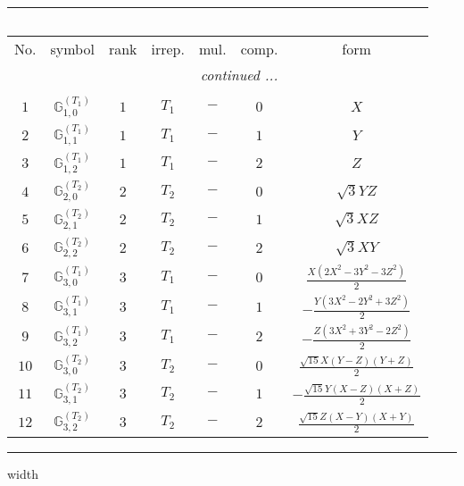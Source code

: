 \documentclass[fleqn,10pt,landscape]{article}
\begin{document}
\begin{itemize}
\begin{center}
\begin{longtable}{ccccccc}
\multicolumn{6}{l}{\tablename\ \thetable{}} \\
 \hline \hline
No. & symbol & rank & irrep. & mul. & comp. & form \\ \hline \endhead

 \hline \hline
\multicolumn{6}{r}{\footnotesize\it continued ...} \\ \endfoot

 \hline \hline
\multicolumn{6}{r}{} \\ \endlastfoot

$ 1 $ & $ \mathbb{G}_{1,0}^{(T_{1})} $ & $ 1 $ & $ T_{1} $ & $ - $ & $ 0 $ & $ X $ \\
$ 2 $ & $ \mathbb{G}_{1,1}^{(T_{1})} $ & $ 1 $ & $ T_{1} $ & $ - $ & $ 1 $ & $ Y $ \\
$ 3 $ & $ \mathbb{G}_{1,2}^{(T_{1})} $ & $ 1 $ & $ T_{1} $ & $ - $ & $ 2 $ & $ Z $ \\ \hline
$ 4 $ & $ \mathbb{G}_{2,0}^{(T_{2})} $ & $ 2 $ & $ T_{2} $ & $ - $ & $ 0 $ & $ \sqrt{3} Y Z $ \\
$ 5 $ & $ \mathbb{G}_{2,1}^{(T_{2})} $ & $ 2 $ & $ T_{2} $ & $ - $ & $ 1 $ & $ \sqrt{3} X Z $ \\
$ 6 $ & $ \mathbb{G}_{2,2}^{(T_{2})} $ & $ 2 $ & $ T_{2} $ & $ - $ & $ 2 $ & $ \sqrt{3} X Y $ \\ \hline
$ 7 $ & $ \mathbb{G}_{3,0}^{(T_{1})} $ & $ 3 $ & $ T_{1} $ & $ - $ & $ 0 $ & $ \frac{X \left(2 X^{2} - 3 Y^{2} - 3 Z^{2}\right)}{2} $ \\
$ 8 $ & $ \mathbb{G}_{3,1}^{(T_{1})} $ & $ 3 $ & $ T_{1} $ & $ - $ & $ 1 $ & $ - \frac{Y \left(3 X^{2} - 2 Y^{2} + 3 Z^{2}\right)}{2} $ \\
$ 9 $ & $ \mathbb{G}_{3,2}^{(T_{1})} $ & $ 3 $ & $ T_{1} $ & $ - $ & $ 2 $ & $ - \frac{Z \left(3 X^{2} + 3 Y^{2} - 2 Z^{2}\right)}{2} $ \\
$ 10 $ & $ \mathbb{G}_{3,0}^{(T_{2})} $ & $ 3 $ & $ T_{2} $ & $ - $ & $ 0 $ & $ \frac{\sqrt{15} X \left(Y - Z\right) \left(Y + Z\right)}{2} $ \\
$ 11 $ & $ \mathbb{G}_{3,1}^{(T_{2})} $ & $ 3 $ & $ T_{2} $ & $ - $ & $ 1 $ & $ - \frac{\sqrt{15} Y \left(X - Z\right) \left(X + Z\right)}{2} $ \\
$ 12 $ & $ \mathbb{G}_{3,2}^{(T_{2})} $ & $ 3 $ & $ T_{2} $ & $ - $ & $ 2 $ & $ \frac{\sqrt{15} Z \left(X - Y\right) \left(X + Y\right)}{2} $ \\
\end{longtable}
\end{center}

 \hfil \hrule height 1mm width \textwidth \hfil


\end{itemize}
\end{document}
